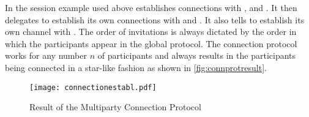 In the session example used above  establishes connections with ,  and . It then delegates  to establish its own connections with  and . It also tells  to establish its own channel with . The order of invitations is always dictated by the order in which the participants appear in the global protocol. The connection protocol works for any number $n$ of participants and always results in the participants being connected in a star-like fashion as shown in \autoref{fig:connprotresult}.

\begin{figure}[H]
\begin{center}
\texttt{[image: connectionestabl.pdf]}
\caption{Result of the Multiparty Connection Protocol}
\label{fig:connprotresult}
\end{center}
\end{figure}










